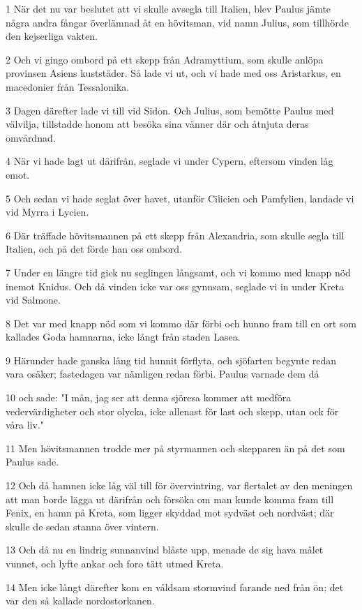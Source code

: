 \par 1 När det nu var beslutet att vi skulle avsegla till Italien, blev Paulus jämte några andra fångar överlämnad åt en hövitsman, vid namn Julius, som tillhörde den kejserliga vakten.
\par 2 Och vi gingo ombord på ett skepp från Adramyttium, som skulle anlöpa provinsen Asiens kuststäder. Så lade vi ut, och vi hade med oss Aristarkus, en macedonier från Tessalonika.
\par 3 Dagen därefter lade vi till vid Sidon. Och Julius, som bemötte Paulus med välvilja, tillstadde honom att besöka sina vänner där och åtnjuta deras omvårdnad.
\par 4 När vi hade lagt ut därifrån, seglade vi under Cypern, eftersom vinden låg emot.
\par 5 Och sedan vi hade seglat över havet, utanför Cilicien och Pamfylien, landade vi vid Myrra i Lycien.
\par 6 Där träffade hövitsmannen på ett skepp från Alexandria, som skulle segla till Italien, och på det förde han oss ombord.
\par 7 Under en längre tid gick nu seglingen långsamt, och vi kommo med knapp nöd inemot Knidus. Och då vinden icke var oss gynnsam, seglade vi in under Kreta vid Salmone.
\par 8 Det var med knapp nöd som vi kommo där förbi och hunno fram till en ort som kallades Goda hamnarna, icke långt från staden Lasea.
\par 9 Härunder hade ganska lång tid hunnit förflyta, och sjöfarten begynte redan vara osäker; fastedagen var nämligen redan förbi. Paulus varnade dem då
\par 10 och sade: "I mån, jag ser att denna sjöresa kommer att medföra vedervärdigheter och stor olycka, icke allenast för last och skepp, utan ock för våra liv."
\par 11 Men hövitsmannen trodde mer på styrmannen och skepparen än på det som Paulus sade.
\par 12 Och då hamnen icke låg väl till för övervintring, var flertalet av den meningen att man borde lägga ut därifrån och försöka om man kunde komma fram till Fenix, en hamn på Kreta, som ligger skyddad mot sydväst och nordväst; där skulle de sedan stanna över vintern.
\par 13 Och då nu en lindrig sunnanvind blåste upp, menade de sig hava målet vunnet, och lyfte ankar och foro tätt utmed Kreta.
\par 14 Men icke långt därefter kom en våldsam stormvind farande ned från ön; det var den så kallade nordostorkanen.

